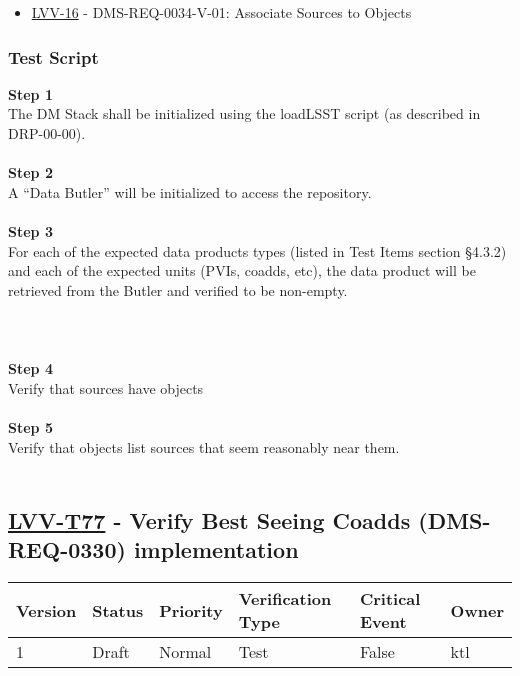 \begin{itemize}
\tightlist
\item
  \href{https://jira.lsstcorp.org/browse/LVV-16}{LVV-16} -
  DMS-REQ-0034-V-01: Associate Sources to Objects
\end{itemize}

\hypertarget{test-script-2}{%
\subsubsection{Test Script}\label{test-script-2}}

\textbf{Step 1}\\
The DM Stack shall be initialized using the loadLSST script (as
described in DRP-00-00).\\
~\\
\textbf{Step 2}\\
A ``Data Butler'' will be initialized to access the repository.\\
~\\
\textbf{Step 3}\\
For each of the expected data products types (listed in Test Items
section §4.3.2) and each of the expected units (PVIs, coadds, etc), the
data product will be retrieved from the Butler and verified to be
non-empty.\\
~\\
~\\
~\\
\textbf{Step 4}\\
Verify that sources have objects\\
~\\
\textbf{Step 5}\\
Verify that objects list sources that seem reasonably near them.\\
~\\

\hypertarget{lvv-t77---verify-best-seeing-coadds-dms-req-0330-implementation}{%
\subsection{\texorpdfstring{\href{https://jira.lsstcorp.org/secure/Tests.jspa\#/testCase/LVV-T77}{LVV-T77}
- Verify Best Seeing Coadds (DMS-REQ-0330)
implementation}{LVV-T77 - Verify Best Seeing Coadds (DMS-REQ-0330) implementation}}\label{lvv-t77---verify-best-seeing-coadds-dms-req-0330-implementation}}

\begin{longtable}[]{@{}llllll@{}}
\toprule
Version & Status & Priority & Verification Type & Critical Event &
Owner\tabularnewline
\midrule
\endhead
1 & Draft & Normal & Test & False & ktl\tabularnewline
\bottomrule
\end{longtable}

